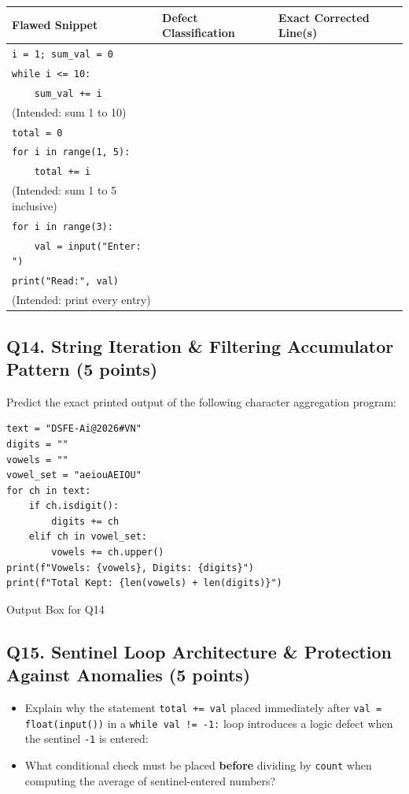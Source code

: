 \documentclass[11pt,a4paper]{article}
\begin{document}
\renewcommand{\arraystretch}{1.15}
\begin{tabularx}{\textwidth}{|X|p{4.2cm}|p{6.0cm}|}
\hline
\textbf{Flawed Snippet} & \textbf{Defect Classification} & \textbf{Exact Corrected Line(s)} \\
\hline
\texttt{i = 1; sum\_val = 0}\\
\texttt{while i <= 10:}\\
\texttt{\ \ \ \ sum\_val += i}\\
(Intended: sum 1 to 10) & & \\[3.2mm]
\hline
\texttt{total = 0}\\
\texttt{for i in range(1, 5):}\\
\texttt{\ \ \ \ total += i}\\
(Intended: sum 1 to 5 inclusive) & & \\[3.2mm]
\hline
\texttt{for i in range(3):}\\
\texttt{\ \ \ \ val = input("Enter: ")}\\
\texttt{print("Read:", val)}\\
(Intended: print every entry) & & \\[3.2mm]
\hline
\end{tabularx}

\vspace{1mm}
\subsection*{Q14. String Iteration \& Filtering Accumulator Pattern (5 points)}
Predict the exact printed output of the following character aggregation program:

\begin{lstlisting}
text = "DSFE-Ai@2026#VN"
digits = ""
vowels = ""
vowel_set = "aeiouAEIOU"
for ch in text:
    if ch.isdigit():
        digits += ch
    elif ch in vowel_set:
        vowels += ch.upper()
print(f"Vowels: {vowels}, Digits: {digits}")
print(f"Total Kept: {len(vowels) + len(digits)}")
\end{lstlisting}

\begin{answerbox}[height=2.2cm]{Output Box for Q14}
\end{answerbox}

\vspace{1mm}
\subsection*{Q15. Sentinel Loop Architecture \& Protection Against Anomalies (5 points)}
\begin{itemize}[leftmargin=2em]
  \item Explain why the statement \texttt{total += val} placed immediately after \texttt{val = float(input())} in a \texttt{while val != -1:} loop introduces a logic defect when the sentinel \texttt{-1} is entered: \hrulefill
  \item What conditional check must be placed \textbf{before} dividing by \texttt{count} when computing the average of sentinel-entered numbers? \hrulefill
\end{itemize}
\end{document}
